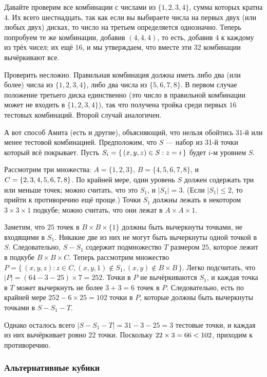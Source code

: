Давайте проверим все комбинации с числами из $\{1, 2, 3, 4\}$, сумма которых кратна $4$.
Их всего шестнадцать, так как если вы выбираете числа на первых двух (или любых двух) дисках, то число на третьем определяется однозначно.
Теперь попробуем те же комбинации, добавив $(4,4,4)$, то есть, добавив $4$ к каждому из трёх чисел;
их ещё $16$, и мы утверждаем, что вместе эти $32$ комбинации вычёркивают все.

Проверить несложно.
Правильная комбинация должна иметь либо два (или более) числа из $\{1, 2, 3, 4\}$, либо два числа из  $\{5, 6, 7, 8\}$.
В первом случае положение третьего диска единственно (это число в правильной комбинации может не входить в $\{1, 2, 3, 4\}$), так что получена тройка среди первых $16$ тестовых комбинаций.
Второй случай аналогичен.

А вот способ Амита (есть и другие), объясняющий, что нельзя обойтись $31$-й или менее тестовой комбинацией.
Предположим, что $S$ --- набор из 31-й точки который всё покрывает.
Пусть $S_i = \{\,(x, y, z) \z\in S : z = i\,\}$ будет $i$-м уровнем $S$.

Рассмотрим три множества:
$A=\{1, 2, 3\}$,
$B = \{4, 5, 6, 7, 8\}$,
и $C \z= \{2, 3, 4, 5, 6, 7, 8\}$.
По крайней мере, один уровень $S$ должен содержать три или меньше точек;
можно считать, что это $S_1$, и $|S_1| = 3$.
(Если $|S_1| \le 2$, то прийти к противоречию ещё проще.)
Точки $S_1$ должны лежать в некотором $3 \times 3 \times 1$ подкубе;
можно считать, что они лежат в $A \times A \times {1}$.

Заметим, что $25$ точек в $B \times B \times \{1\}$ должны быть вычеркнуты точками, не входящими в $S_1$.
Никакие две из них не могут быть вычеркнуты одной точкой в $S$.
Следовательно, $S - S_1$ содержит подмножество $T$ размером $25$, которое лежит в подкубе $B \times B \times C$.
Теперь рассмотрим множество $P = \{\,(x, y, z) : z \in C, (x, y, 1) \notin S_1 , (x, y) \notin B \times B\,\}$.
Легко подсчитать, что $|P| = (64-3-25) \times 7 = 252$.
Точки в $P$ не вычёркиваются $S_1$, и каждая точка в $T$ может вычеркнуть не более $3 + 3 = 6$ точек в $P$. Следовательно, есть по крайней мере $252 - 6 \times 25 = 102$ точки в $P$, которые должны быть вычеркнуты точками в $S - S_1 - T$.

Однако осталось всего $|S - S_1 - T | = 31 - 3 - 25 = 3$ тестовые точки, и каждая из них вычёркивает ровно $22$ точки.
Поскольку $22 \times 3 = 66 \z< 102$, приходим к противоречию. 

\subsubsection*{Альтернативные кубики}

